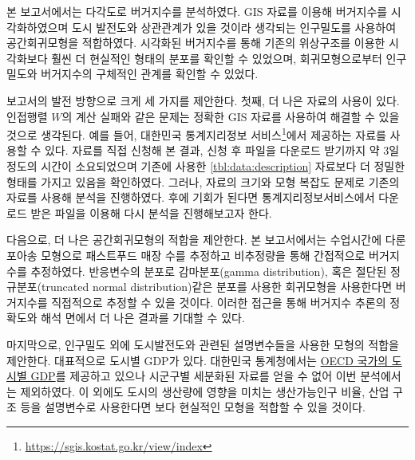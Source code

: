 \documentclass{scrartcl}
\begin{document}
본 보고서에서는 다각도로 버거지수를 분석하였다. GIS 자료를 이용해 버거지수를 시각화하였으며 도시 발전도와 상관관계가 있을 것이라 생각되는 인구밀도를 사용하여 공간회귀모형을 적합하였다. 시각화된 버거지수를 통해 기존의 위상구조를 이용한 시각화보다 훨씬 더 현실적인 형태의 분포를 확인할 수 있었으며, 회귀모형으로부터 인구밀도와 버거지수의 구체적인 관계를 확인할 수 있었다. 

보고서의 발전 방향으로 크게 세 가지를 제안한다. 첫째, 더 나은 자료의 사용이 있다. 인접행렬 $W$의 계산 실패와 같은 문제는 정확한 GIS 자료를 사용하여 해결할 수 있을 것으로 생각된다. 예를 들어, 대한민국 통계지리정보 서비스\footnote{\url{https://sgis.kostat.go.kr/view/index}}에서 제공하는 자료를 사용할 수 있다. 자료를 직접 신청해 본 결과, 신청 후 파일을 다운로드 받기까지 약 3일 정도의 시간이 소요되었으며 기존에 사용한 \autoref{tbl:data:description} 자료보다 더 정밀한 형태를 가지고 있음을 확인하였다. 그러나, 자료의 크기와 모형 복잡도 문제로 기존의 자료를 사용해 분석을 진행하였다. 후에 기회가 된다면 통계지리정보서비스에서 다운로드 받은 파일을 이용해 다시 분석을 진행해보고자 한다.

다음으로, 더 나은 공간회귀모형의 적합을 제안한다. 본 보고서에서는 수업시간에 다룬 포아송 모형으로 패스트푸드 매장 수를 추정하고 비추정량을 통해 간접적으로 버거지수를 추정하였다. 반응변수의 분포로 감마분포(gamma distribution), 혹은 절단된 정규분포(truncated normal distribution)\와 같은 분포를 사용한 회귀모형을 사용한다면 버거지수를 직접적으로 추정할 수 있을 것이다. 이러한 접근을 통해 버거지수 추론의 정확도와 해석 면에서 더 나은 결과를 기대할 수 있다.

마지막으로, 인구밀도 외에 도시발전도와 관련된 설명변수들을 사용한 모형의 적합을 제안한다. 대표적으로 도시별 GDP가 있다. 대한민국 통계청에서는 \href{http://kosis.kr/statHtml/statHtml.do?orgId=101&tblId=DT\_2KAA912\_OECD}{OECD 국가의 도시별 GDP}를 제공하고 있으나 시군구별 세분화된 자료를 얻을 수 없어 이번 분석에서는 제외하였다. 이 외에도 도시의 생산량에 영향을 미치는 생산가능인구 비율, 산업 구조 등을 설명변수로 사용한다면 보다 현실적인 모형을 적합할 수 있을 것이다.

\nocite{hoff2009first}
\nocite{lim8}
\nocite{gelman2013bayesian}

\end{document}
